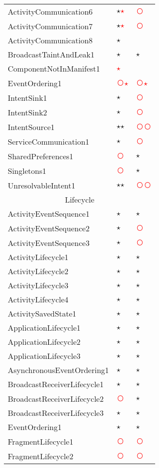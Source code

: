 \documentclass[../draft.tex]{subfiles}
\newcommand{\fp}{\textcolor{white}{\textcircled{\textcolor{red}{$\star$}}}}
\newcommand{\fn}{\textcolor{red}{\textcircled{ }}}
\newcommand{\tp}[0]{\textcircled{$\star$}}
\newcommand{\tsub}[1]{\multicolumn{3}{c}{#1}\\\hline}
\begin{document}
\begin{longtable}{l | l | l}
        ActivityCommunication6 & \tp \fp & \fn\\
        ActivityCommunication7 & \tp \fp & \fn\\
        ActivityCommunication8 & \tp & \\
        BroadcastTaintAndLeak1 & \tp & \tp\\
        ComponentNotInManifest1 & \fp & \\
        EventOrdering1 & \fn \fp & \fn \fp\\
        IntentSink1 & \tp & \fn\\
        IntentSink2 & \tp & \fn\\
        IntentSource1 & \tp \tp & \fn \fn\\ 
        ServiceCommunication1 & \tp & \fn\\
        SharedPreferences1 & \fn & \tp\\
        Singletons1 & \fn & \tp\\
        UnresolvableIntent1 & \tp \tp & \fn \fn\\
        \hline
        \tsub{Lifecycle}
        ActivityEventSequence1 & \tp & \tp\\
        ActivityEventSequence2 & \tp & \fn\\
        ActivityEventSequence3 & \tp & \fn\\
        ActivityLifecycle1 & \tp & \tp\\
        ActivityLifecycle2 & \tp & \tp\\
        ActivityLifecycle3 & \tp & \tp\\
        ActivityLifecycle4 & \tp & \tp\\
        ActivitySavedState1 & \tp & \tp\\
        ApplicationLifecycle1 & \tp & \tp\\
        ApplicationLifecycle2 & \tp & \tp\\
        ApplicationLifecycle3 & \tp & \tp\\
        AsynchronousEventOrdering1 & \tp & \tp\\
        BroadcastReceiverLifecycle1 & \tp & \tp\\
        BroadcastReceiverLifecycle2 & \fn & \tp\\
        BroadcastReceiverLifecycle3 & \tp & \tp\\
        EventOrdering1 & \tp & \tp\\
        FragmentLifecycle1 & \fn & \fn\\
        FragmentLifecycle2 & \fn & \fn\\

\end{longtable}
\end{document}
